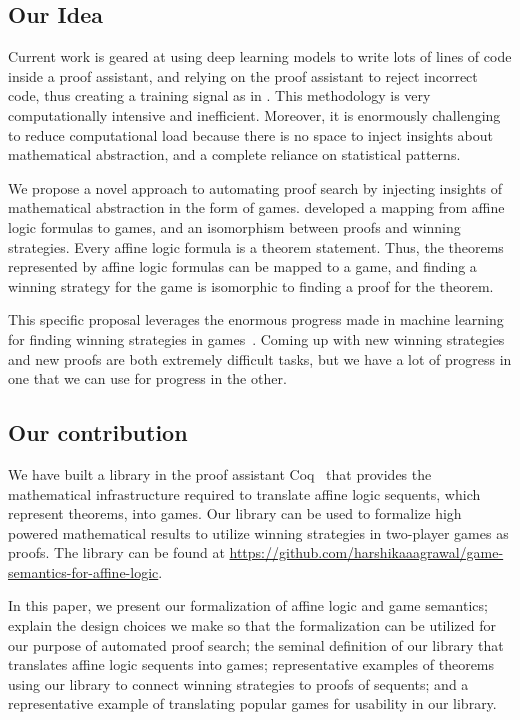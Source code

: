 \documentclass{article}
\theoremstyle{definition}
\begin{document}
\subsection{Our Idea}
Current work is geared at using deep learning models to write lots of lines of code inside a proof assistant, and relying on the proof assistant to reject incorrect code, thus creating a training signal as in \textcite{DBLP:journals/corr/LoosISK17, DBLP:journals/corr/abs-1805-07563}. This methodology is very computationally intensive and inefficient. Moreover, it is enormously challenging to reduce computational load because there is no space to inject insights about mathematical abstraction, and a complete reliance on statistical patterns. 

We propose a novel approach to automating proof search by injecting insights of mathematical abstraction in the form of games. \textcite{Blass1992} developed a mapping from affine logic formulas to games, and an isomorphism between proofs and winning strategies. Every affine logic formula is a theorem statement. Thus, the theorems represented by affine logic formulas can be mapped to a game, and finding a winning strategy for the game is isomorphic to finding a proof for the theorem.

This specific proposal leverages the enormous progress made in machine learning for finding winning strategies in games~\cite{AlphaGo,alphastarblog}. Coming up with new winning strategies and new proofs are both extremely difficult tasks, but we have a lot of progress in one that we can use for progress in the other. 

\subsection{Our contribution}

We have built a library in the proof assistant Coq~\cite{coq} that provides the mathematical infrastructure required to translate affine logic sequents, which represent theorems, into games. Our library can be used to formalize high powered mathematical results to utilize winning strategies in two-player games as proofs. The library can be found at \url{https://github.com/harshikaaagrawal/game-semantics-for-affine-logic}.

In this paper, we present our formalization of affine logic and game semantics; explain the design choices we make so that the formalization can be utilized for our purpose of automated proof search; the seminal definition of our library that translates affine logic sequents into games; representative examples of theorems using our library to connect winning strategies to proofs of sequents; and a representative example of translating popular games for usability in our library.
\end{document}
